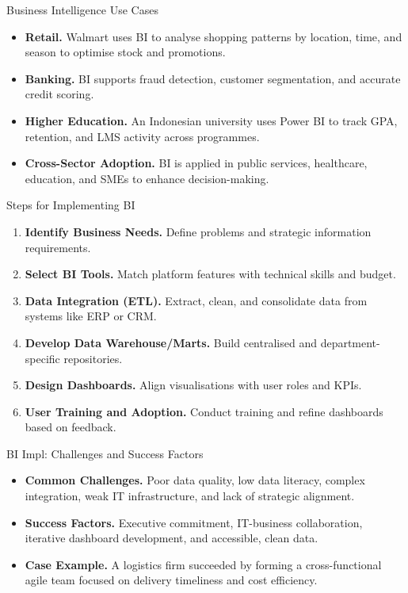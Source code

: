 \documentclass[aspectratio=169, table]{beamer}
\begin{document}
\begin{frame}{Business Intelligence Use Cases}
	\vspace{20pt}
	\begin{itemize}
		\item \textbf{Retail.} Walmart uses BI to analyse shopping patterns by location, time, and season to optimise stock and promotions.
		\item \textbf{Banking.} BI supports fraud detection, customer segmentation, and accurate credit scoring.
		\item \textbf{Higher Education.} An Indonesian university uses Power BI to track GPA, retention, and LMS activity across programmes.
		\item \textbf{Cross-Sector Adoption.} BI is applied in public services, healthcare, education, and SMEs to enhance decision-making.
	\end{itemize}
\end{frame}


\begin{frame}{Steps for Implementing BI}
	\vspace{20pt}
	\begin{enumerate}
		\item \textbf{Identify Business Needs.} Define problems and strategic information requirements.
		\item \textbf{Select BI Tools.} Match platform features with technical skills and budget.
		\item \textbf{Data Integration (ETL).} Extract, clean, and consolidate data from systems like ERP or CRM.
		\item \textbf{Develop Data Warehouse/Marts.} Build centralised and department-specific repositories.
		\item \textbf{Design Dashboards.} Align visualisations with user roles and KPIs.
		\item \textbf{User Training and Adoption.} Conduct training and refine dashboards based on feedback.
	\end{enumerate}
\end{frame}



\begin{frame}{BI Impl: Challenges and Success Factors}
	\vspace{20pt}
	\begin{itemize}
		\item \textbf{Common Challenges.} Poor data quality, low data literacy, complex integration, weak IT infrastructure, and lack of strategic alignment.
		\item \textbf{Success Factors.} Executive commitment, IT-business collaboration, iterative dashboard development, and accessible, clean data.
		\item \textbf{Case Example.} A logistics firm succeeded by forming a cross-functional agile team focused on delivery timeliness and cost efficiency.
	\end{itemize}
\end{frame}
\end{document}
